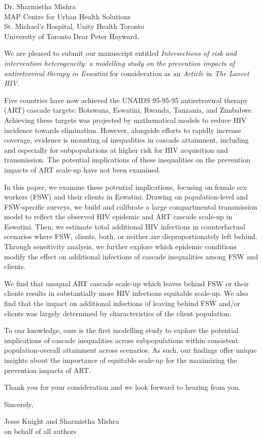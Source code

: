 \address{
  Peter Hayward\\
  Editor-in-Chief\\
  The Lancet HIV
}{Dr. Sharmistha Mishra\\
  MAP Centre for Urban Health Solutions\\
  St. Michael's Hospital, Unity Health Toronto\\
  University of Toronto}
Dear Peter Hayward,
\par
We are pleased to submit our manuscript entitled
\emph{Intersections of risk and intervention heterogeneity:
  a modelling study on the prevention impacts of antiretroviral therapy in Eswatini}
for consideration as an \emph{Article} in \emph{The Lancet HIV}.
\par
Five countries have now achieved
the UNAIDS 95-95-95 antiretroviral therapy (ART) cascade targets:
Botswana, Eswatini, Rwanda, Tanzania, and Zimbabwe.
Achieving these targets was projected by
mathematical models to reduce HIV incidence towards elimination.
However, alongside efforts to rapidly increase coverage,
evidence is mounting of inequalities in cascade attainment,
including and especially for subpopulations
at higher risk for HIV acquisition and transmission.
The potential implications of these inequalities on
the prevention impacts of ART scale-up have not been examined.
\par
In this paper, we examine these potential implications,
focusing on female sex workers (FSW) and their clients in Eswatini.
Drawing on population-level and FSW-specific surveys,
we build and calibrate a large compartmental transmission model
to reflect the observed HIV epidemic and ART cascade scale-up in Eswatini.
Then, we estimate total additional HIV infections in counterfactual scenarios where
FSW, clients, both, or neither are disproportionately left behind.
Through sensitivity analysis, we further explore which epidemic conditions modify
the effect on additional infections of cascade inequalities among FSW and clients.
\par
We find that unequal ART cascade scale-up which leaves behind FSW or their clients
results in substantially more HIV infections \vs equitable scale-up.
We also find that the impact on additional infections of
leaving behind FSW and/or clients was largely determined by
characteristics of the client population.
\par
To our knowledge, ours is the first modelling study to explore
the potential implications of cascade inequalities across subpopulations
within consistent population-overall attainment across scenarios.
As such, our findings offer unique insights about
the importance of equitable scale-up
for the maximizing the prevention impacts of ART.
\par
Thank you for your consideration and we look forward to hearing from you.
\medskip\par
Sincerely,
\par
Jesse Knight and Sharmistha Mishra\\
on behalf of all authors
